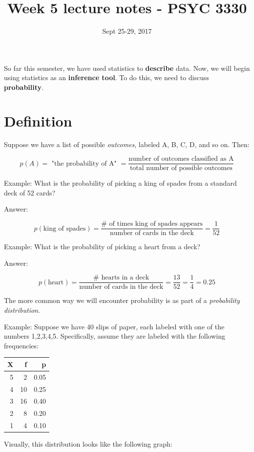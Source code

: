 \documentclass[11pt]{article}
\date{Sept 25-29, 2017}
\title{Week 5 lecture notes - PSYC 3330}
\begin{document}
\maketitle
So far this semester, we have used statistics to \textbf{describe} data.  Now, we will begin using statistics as an \textbf{inference tool}.  To do this, we need to discuss \textbf{probability}.

\section*{Definition}
\label{sec-1}

Suppose we have a list of possible \emph{outcomes}, labeled A, B, C, D, and so on.  Then:

\[
p(A) = \text{ "the probability of A" }=\frac{\text{number of outcomes classified as A}}{\text{total number of possible outcomes}}
\]

Example: What is the probability of picking a king of spades from a standard deck of 52 cards?

Answer:

\[
p(\text{king of spades}) = \frac{\text{# of times king of spades appears}}{\text{number of cards in the deck}} = \frac{1}{52}
\]

Example: What is the probability of picking a heart from a deck?

Answer:

\[
p(\text{heart}) = \frac{\text{# hearts in a deck}}{\text{number of cards in the deck}} = \frac{13}{52} =\frac{1}{4} = 0.25
\]

The more common way we will encounter probability is as part of a \emph{probability distribution}.

Example: Suppose we have 40 slips of paper, each labeled with one of the numbers 1,2,3,4,5.  Specifically, assume they are labeled with the following frequencies:

\begin{center}
\begin{tabular}{rrr}
X & f & p\\
\hline
5 & 2 & 0.05\\
4 & 10 & 0.25\\
3 & 16 & 0.40\\
2 & 8 & 0.20\\
1 & 4 & 0.10\\
\end{tabular}
\end{center}

Visually, this distribution looks like the following graph:
\end{document}
